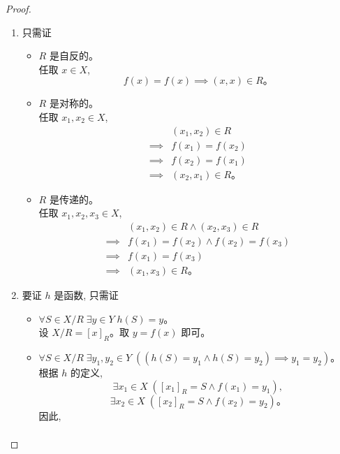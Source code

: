 \documentclass[a4paper, justified]{tufte-handout}
\begin{document}
\begin{proof}
    \begin{enumerate}[(1)]
    \item 只需证
      \begin{itemize}
        \item $R$ 是自反的。\\
          任取 $x \in X$,
          \[
            f(x) = f(x) \implies (x, x) \in R\text{。}
          \]
        \item $R$ 是对称的。\\
          任取 $x_{1}, x_{2} \in X$,
          \begin{align*}
            & (x_{1}, x_{2}) \in R \\
            \implies & f(x_{1}) = f(x_{2}) \\
            \implies & f(x_{2}) = f(x_{1}) \\
            \implies & (x_{2}, x_{1}) \in R\text{。}
          \end{align*}
        \item $R$ 是传递的。\\
          任取 $x_{1}, x_{2}, x_{3} \in X$,
          \begin{align*}
            & (x_{1}, x_{2}) \in R \land (x_{2}, x_{3}) \in R \\
            \implies & f(x_{1}) = f(x_{2}) \land f(x_{2}) = f(x_{3}) \\
            \implies & f(x_{1}) = f(x_{3}) \\
            \implies & (x_{1}, x_{3}) \in R\text{。}
          \end{align*}
      \end{itemize}
    \item 要证 $h$ 是函数, 只需证
      \begin{itemize}
        \item $\forall S \in X/R\; \exists y \in Y\; h(S) = y$。\\
          设 $X/R = [x]_{R}$。取 $y = f(x)$ 即可。
        \item $\forall S \in X/R\; \exists y_{1}, y_{2} \in Y\;
          ((h(S) = y_{1} \land h(S) = y_{2}) \implies y_{1} = y_{2})$。\\
          根据 $h$ 的定义,
          \[
            \exists x_{1} \in X\; ([x_{1}]_{R} = S \land f(x_{1}) = y_{1}),
          \]
          \[
            \exists x_{2} \in X\; ([x_{2}]_{R} = S \land f(x_{2}) = y_{2})\text{。}
          \]
          因此,
          \begin{align*}

\end{align*}
\end{itemize}
\end{enumerate}
\end{proof}
\end{document}
